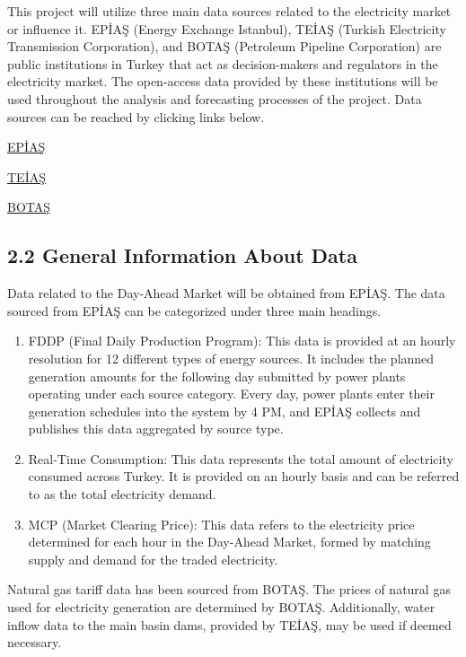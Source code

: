 \documentclass[
  11pt,
  a4paper,
]{article}
\begin{document}
This project will utilize three main data sources related to the
electricity market or influence it. EPİAŞ (Energy Exchange Istanbul),
TEİAŞ (Turkish Electricity Transmission Corporation), and BOTAŞ
(Petroleum Pipeline Corporation) are public institutions in Turkey that
act as decision-makers and regulators in the electricity market. The
open-access data provided by these institutions will be used throughout
the analysis and forecasting processes of the project. Data sources can
be reached by clicking links below.

\href{https://seffaflik.epias.com.tr/home}{EPİAŞ}

\href{https://www.teias.gov.tr/sektor-raporlari}{TEİAŞ}

\href{https://www.botas.gov.tr/Sayfa/satis-fiyat-tarifesi/439}{BOTAŞ}

\subsection{2.2 General Information About
Data}\label{general-information-about-data}

Data related to the Day-Ahead Market will be obtained from EPİAŞ. The
data sourced from EPİAŞ can be categorized under three main headings.

\begin{enumerate}
\def\labelenumi{\arabic{enumi})}
\item
  FDDP (Final Daily Production Program): This data is provided at an
  hourly resolution for 12 different types of energy sources. It
  includes the planned generation amounts for the following day
  submitted by power plants operating under each source category. Every
  day, power plants enter their generation schedules into the system by
  4 PM, and EPİAŞ collects and publishes this data aggregated by source
  type.
\item
  Real-Time Consumption: This data represents the total amount of
  electricity consumed across Turkey. It is provided on an hourly basis
  and can be referred to as the total electricity demand.
\item
  MCP (Market Clearing Price): This data refers to the electricity price
  determined for each hour in the Day-Ahead Market, formed by matching
  supply and demand for the traded electricity.
\end{enumerate}

Natural gas tariff data has been sourced from BOTAŞ. The prices of
natural gas used for electricity generation are determined by BOTAŞ.
Additionally, water inflow data to the main basin dams, provided by
TEİAŞ, may be used if deemed necessary.
\end{document}
